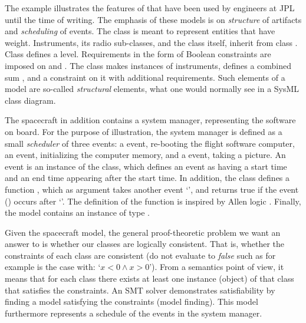 The example illustrates the features of \Klang{} that have been used
by engineers at JPL until the time of writing. The emphasis of these
models is on {\em structure} of artifacts and {\em scheduling} of
events. The class  is meant to represent entities that
have weight. Instruments, its radio sub-classes, and the
 class itself, inherit from class . Class
 defines a  level. Requirements in the form of
Boolean constraints are imposed on  and . The
 class makes instances of instruments, defines a
combined sum , and a constraint on it with
additional requirements. Such elements of a model are so-called {\em
  structural} elements, what one would normally see in a SysML class
diagram.

The spacecraft in addition contains a system manager, representing the
software on board. For the purpose of illustration, the system manager
is defined as a small {\em scheduler} of three events: a 
event, re-booting the flight software computer, an 
event, initializing the computer memory, and a  event,
taking a picture. An event is an instance of the  class,
which defines an event as having a start time and an end time
appearing after the start time. In addition, the  class
defines a function , which as argument takes another event
`', and returns true if the event () occurs after
`'.  The definition of the  function is inspired
by Allen logic \cite{allen-logic-84}.
%
Finally, the model contains an instance  of type
.

Given the spacecraft model, the general proof-theoretic problem we
want an answer to is whether our classes are logically
consistent. That is, whether the constraints of each class are
consistent (do not evaluate to {\em false} such as for example is the
case with: `$x < 0 \wedge x > 0$'). From a semantics point of view, it
means that for each class there exists at least one instance (object)
of that class that satisfies the constraints.  An SMT solver demonstrates
satisfiability by finding a model satisfying the constraints
(model finding). This model furthermore represents a schedule of the events in
the system manager.


